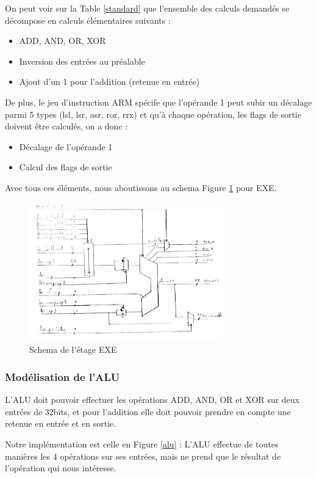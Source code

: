 \documentclass{article}
\begin{document}
On peut voir sur la Table \ref{standard} que l'ensemble des calculs demandés se décompose
en calculs élémentaires suivants :
\begin{itemize}
  \item ADD, AND, OR, XOR
  \item Inversion des entrées au préalable
  \item Ajout d'un 1 pour l'addition (retenue en entrée)
\end{itemize}

De plus, le jeu d'instruction ARM spécife que l'opérande 1 peut subir un décalage
parmi 5 types (lsl, lsr, asr, ror, rrx) et qu'à chaque opération, les flags de sortie
doivent être calculés, on a donc :
\begin{itemize}
  \item Décalage de l'opérande 1
  \item Calcul des flags de sortie
\end{itemize}

Avec tous ces éléments, nous aboutissons au schema Figure \ref{exe} pour EXE.

\begin{figure}[H]
\includegraphics[width=0.75\textwidth]{pics/exe.png}
\centering
\caption{Schema de l'étage EXE}
\label{exe}
\end{figure}

\subsubsection{Modélisation de l'ALU}

L'ALU doit pouvoir effectuer les opérations ADD, AND, OR et XOR sur deux entrées de 32bits,
et pour l'addition elle doit pouvoir prendre en compte une retenue en entrée et en sortie.

Notre implémentation est celle en Figure \ref{alu} : L'ALU effectue de toutes manières les
4 opérations sur ses entrées, mais ne prend que le résultat de l'opération qui nous intéresse.
\end{document}
